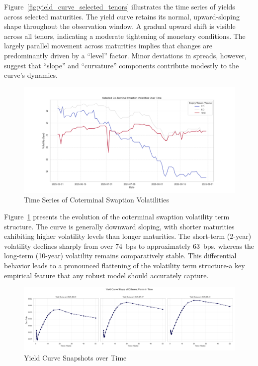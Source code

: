 Figure~\ref{fig:yield_curve_selected_tenors} illustrates the time series of yields across selected maturities. The yield curve retains its normal, upward-sloping shape throughout the observation window. A gradual upward shift is visible across all tenors, indicating a moderate tightening of monetary conditions. The largely parallel movement across maturities implies that changes are predominantly driven by a “level” factor. Minor deviations in spreads, however, suggest that “slope” and “curvature” components contribute modestly to the curve's dynamics.

\begin{figure}[H]
	\centering
	\includegraphics[width=1\textwidth]{images/descriptive_data_analysis/vol_surface_coterminal_series.png}
	\caption{Time Series of Coterminal Swaption Volatilities}
	\label{fig:vol_surface_coterminal_series}
\end{figure}

Figure~\ref{fig:vol_surface_coterminal_series} presents the evolution of the coterminal swaption volatility term structure. The curve is generally downward sloping, with shorter maturities exhibiting higher volatility levels than longer maturities. The short-term (2-year) volatility declines sharply from over 74~\ac{bps} to approximately 63~\ac{bps}, whereas the long-term (10-year) volatility remains comparatively stable. This differential behavior leads to a pronounced flattening of the volatility term structure-a key empirical feature that any robust model should accurately capture.

\begin{figure}[H]
	\centering
	\includegraphics[width=1\textwidth]{images/descriptive_data_analysis/yield_curve_2d_snapshots.png}
	\caption{Yield Curve Snapshots over Time}
	\label{fig:yield_curve_2d_snapshots}
\end{figure}


